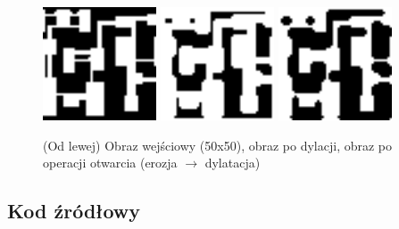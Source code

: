 \documentclass[final,a4paper,openany,12pt]{mwbk}
\begin{document}
\begin{figure}[H]
	\begin{center}
		\includegraphics[width=0.3\textwidth]{2/2Bin_Op_Original}
		\includegraphics[width=0.3\textwidth]{2/2Bin_Op_E_Result}
		\includegraphics[width=0.3\textwidth]{2/2Bin_Op_ED_Result}
	\end{center}
	\caption{(Od lewej) Obraz wejściowy (50x50), obraz po dylacji, obraz po operacji otwarcia (erozja $\rightarrow$ dylatacja)}
\end{figure}


\subsection*{Kod źródłowy}
\end{document}
